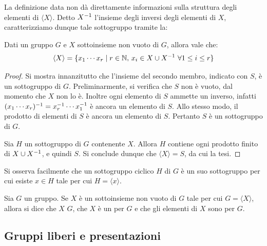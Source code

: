 \documentclass[11pt]{scrartcl}
\begin{document}
	La definizione data non dà direttamente informazioni sulla struttura degli elementi di 
	$\langle X \rangle$. Detto $X^{-1}$ l'insieme degli inversi degli elementi di $X$, caratterizziamo dunque tale sottogruppo tramite
	la:
	
	\begin{proposition}
		Dati un gruppo $G$ e $X$ sottoinsieme non vuoto di $G$, allora vale che:
		\[
		\langle X \rangle = \{x_1 \cdots x_r \mid r 
		\in \mathbb N, \, x_i \in X \cup X^{-1} ~\forall 1 \leq i \leq r\}
		\]
	\end{proposition}
	
	\begin{proof}
		Si mostra innanzitutto che l'insieme del secondo membro, indicato con $S$, è
		un sottogruppo di $G$. Preliminarmente, si verifica che $S$ non è vuoto,
		dal momento che $X$ non lo è. Inoltre ogni elemento di $S$ ammette un
		inverso, infatti $(x_1 \cdots x_r)^{-1} = x_r^{-1} \cdots x_1^{-1}$ è ancora
		un elemento di $S$. Allo stesso modo, il prodotto di elementi di
		$S$ è ancora un elemento di $S$. Pertanto $S$ è un sottogruppo di $G$. \medskip
		
		
		Sia $H$ un sottogruppo di $G$ contenente $X$. Allora $H$ contiene ogni prodotto
		finito di $X \cup X^{-1}$, e quindi $S$. Si conclude dunque che $\langle X \rangle = S$, da cui la tesi.
	\end{proof}
	
	\begin{remark}
		Si osserva facilmente che un sottogruppo ciclico $H$ di $G$ è un suo sottogruppo per cui esiste $x \in H$ tale per cui $H = \langle x \rangle$.
	\end{remark}
	
	\begin{definition}
		Sia $G$ un gruppo. Se $X$ è un sottoinsieme non vuoto di $G$ tale per
		cui $G = \langle X \rangle$, allora si dice che $X$  $G$,
		che $X$ è un  per $G$ e che gli
		elementi di $X$ sono  per $G$.
	\end{definition}
	
	\newpage
	\subsection{Gruppi liberi e presentazioni}
	
\end{document}
